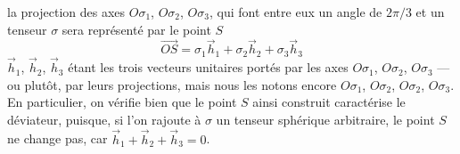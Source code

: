 la projection des axes $O\sigma_1$, $O\sigma_2$, $O\sigma_3$, qui font entre eux un angle de $2\pi/3$ et un tenseur $\mathbb{\sigma}$ sera représenté par le point $S$
\begin{equation}
    \vec{OS} = \sigma_1 \vec{h}_1 + \sigma_2 \vec{h}_2 + \sigma_3 \vec{h}_3
    \label{eq:Ch02-028}
\end{equation}
$\vec{h}_1$, $\vec{h}_2$, $\vec{h}_3$ étant les trois vecteurs unitaires portés par les axes $O\sigma_1$, $O\sigma_2$, $O\sigma_3$ ---ou plutôt, par leurs projections, mais nous les notons encore $O\sigma_1$, $O\sigma_2$, $O\sigma_2$, $O\sigma_3$.
En particulier, on vérifie bien que le point $S$ ainsi construit caractérise le déviateur, puisque, si l'on rajoute à $\mathbb{\sigma}$ un tenseur sphérique arbitraire, le point $S$ ne change pas, car $\vec{h}_1 + \vec{h}_2 + \vec{h}_3 = 0$.

